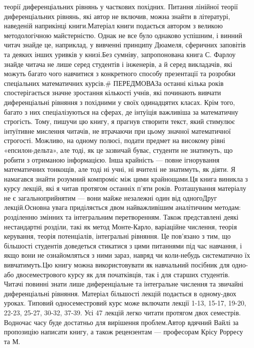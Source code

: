 \documentclass[
  ukrainian,
]{article}
\begin{document}
теорії диференціальних рівнянь у часткових похідних. Питання лінійної
теорії диференціальних рівнянь, які автор не включив, можна знайти в
літературі, наведеній наприкінці книги.Матеріал книги подається автором
з великою методологічною майстерністю. Однак не все було однаково
успішним, і винний читач знайде це, наприклад, у вивченні принципу
Дюамеля, сферичних заповітів та деяких інших уривків у книзі.Без
сумніву, запропонована книга С. Фарлоу знайде читача не лише серед
студентів і інженерів, а й серед викладачів, які можуть багато чого
навчитися з конкретного способу презентації та розробки спеціальних
математичних курсів.\# ПЕРЕДМОВАЗа останні кілька років спостерігається
значне зростання кількості учнів, які починають вивчати диференціальні
рівняння з похідними у своїх одинадцятих класах. Крім того, багато з них
спеціалізуються на сферах, де інтуїція важливіша за математичну
строгість. Тому, пишучи цю книгу, я прагнув створити текст, який
стимулює інтуїтивне мислення читачів, не втрачаючи при цьому значної
математичної строгості. Можливо, на одному полюсі, подати предмет на
високому рівні «епсилон-дельта», але тоді, як це зазвичай буває,
студенти не знатимуть, що робити з отриманою інформацією. Інша крайність
--- повне ігнорування математичних тонкощів, але тоді ні учні, ні
вчителі не знатимуть, як діяти. Я намагався знайти розумний компроміс
між цими крайнощами.Ця книга виникла з курсу лекцій, які я читав
протягом останніх п'яти років. Розташування матеріалу не є
загальноприйнятим --- вони майже незалежні один від одногоДруг
лекцій.Основна увага приділяється двом найважливішим аналітичним
методам: розділенню змінних та інтегральним перетворенням. Також
представлені деякі нестандартні розділи, такі як метод Монте-Карло,
варіаційне числення, теорія керування, теорія потенціалів, інтегральні
рівняння. Це пов'язано з тим, що більшості студентів доведеться
стикатися з цими питаннями під час навчання, і якщо вони не
ознайомляться з ними зараз, навряд чи коли-небудь систематично їх
вивчатимуть.Цю книгу можна використовувати як навчальний посібник для
одно- або двосеместрового курсу як для початківців, так і для старших
студентів. Читачі повинні знати лише диференціальне та інтегральне
числення та звичайні диференціальні рівняння. Матеріал більшості лекцій
подається в одному-двох уроках. Типовий односеместровий курс може
включати лекції 1-13, 15-17, 19-20, 22-23, 25-27, 30-32, 37-39. Усі 47
лекцій легко читати протягом двох семестрів. Водночас часу буде
достатньо для вирішення проблем.Автор вдячний Вайлі за пропозицію
написати книгу, а також рецензентам --- професорам Крісу Рорресу та М.
\end{document}

